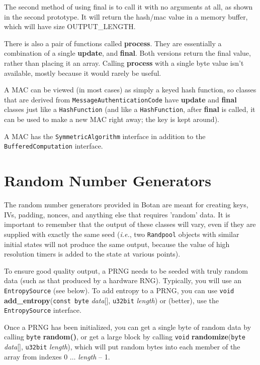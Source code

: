 \documentclass{article}
\newcommand{\function}[1]{\textbf{#1}}
\newcommand{\type}[1]{\texttt{#1}}
\renewcommand{\arg}[1]{\textsl{#1}}
\newcommand{\ie}[0]{\emph{i.e.}}
\begin{document}
The second method of using final is to call it with no arguments at all, as
shown in the second prototype. It will return the hash/mac value in a memory
buffer, which will have size OUTPUT\_LENGTH.

There is also a pair of functions called \function{process}. They are
essentially a combination of a single \function{update}, and \function{final}.
Both versions return the final value, rather than placing it an array. Calling
\function{process} with a single byte value isn't available, mostly because it
would rarely be useful.

A MAC can be viewed (in most cases) as simply a keyed hash function, so classes
that are derived from \type{MessageAuthenticationCode} have \function{update}
and \function{final} classes just like a \type{HashFunction} (and like a
\type{HashFunction}, after \function{final} is called, it can be used to make a
new MAC right away; the key is kept around).

A MAC has the \type{SymmetricAlgorithm} interface in addition to the
\type{BufferedComputation} interface.

\pagebreak
\section{Random Number Generators}

The random number generators provided in Botan are meant for creating keys,
IVs, padding, nonces, and anything else that requires 'random' data. It is
important to remember that the output of these classes will vary, even if they
are supplied with exactly the same seed (\ie, two \type{Randpool} objects with
similar initial states will not produce the same output, because the value of
high resolution timers is added to the state at various points).

To ensure good quality output, a PRNG needs to be seeded with truly random data
(such as that produced by a hardware RNG). Typically, you will use an
\type{EntropySource} (see below). To add entropy to a PRNG, you can use
\type{void} \function{add\_entropy}(\type{const byte} \arg{data}[],
\type{u32bit} \arg{length}) or (better), use the \type{EntropySource}
interface.

Once a PRNG has been initialized, you can get a single byte of random data by
calling \type{byte} \function{random()}, or get a large block by calling
\type{void} \function{randomize}(\type{byte} \arg{data}[], \type{u32bit}
\arg{length}), which will put random bytes into each member of the array from
indexes 0 $\ldots$ \arg{length} -- 1.
\end{document}
